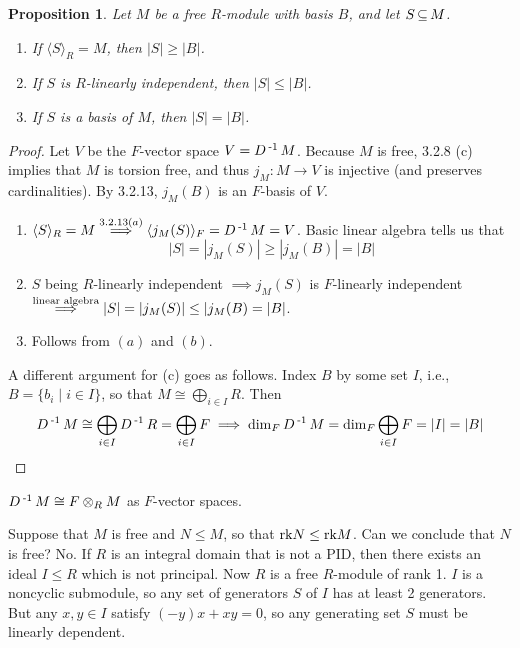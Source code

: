\documentclass[11pt]{book}
\newcounter{counter}
\newtheorem{proposition}[counter]{Proposition}   \newtheorem{problem}[counter]{Problem}   \newtheorem*{proposition*}{Proposition}   \newtheorem*{lemma*}{Lemma}
\theoremstyle{definition}   \newtheorem{defn}[counter]{Definition} %
\newcommand{\gen}[1]{\langle #1 \rangle}   \newcommand{\stab}[2]{\tn{Stab}_{#1}(#2)}   \newcommand{\fix}[2]{\tn{Fix}_{#1}(#2)}   \newcommand{\op}{^{\tn{op}}}
\DeclareMathOperator{\ra}{\rightarrow}   \DeclareMathOperator{\Poly}{\mathbf{P}}   \DeclareMathOperator{\spn}{\textnormal{span}}   \DeclareMathOperator{\aut}{\textnormal{Aut}}
\newcommand{\vs}{\vspace{8pt}}
\numberwithin{counter}{chapter}
\begin{document}
\vs

\begin{proposition}
Let $M$ be a free $R$-module with basis $B$, and let $S \operatorname{\subseteq} M$.
\begin{enumerate}
\item[(a)] If $\gen{S}_R = M$, then $|S| \geq |B|$.
\item[(b)] If $S$ is $R$-linearly independent, then $|S| \leq |B|$.
\item[(c)] If $S$ is a basis of $M$, then $|S| = |B|$.
\end{enumerate}
\end{proposition}

\begin{proof}
Let $V$ be the $F$-vector space $V = D\operatorname{^{-1}} M$. Because $M$ is free, 3.2.8 (c) implies that $M$ is torsion free, and thus $j_M : M \ra V$ is injective (and preserves cardinalities). By 3.2.13, $j_M(B)$ is an $F$-basis of $V$.
\begin{enumerate}
\item[(a)] $\gen{S}_R = M \overset{3.2.13 (a)}{\implies} \gen{j_M(S)}_F = D\inv M = V$. Basic linear algebra tells us that
	\[|S| = |j_M(S)| \geq |j_M(B)| = |B| \]
\item[(b)] $S$ being $R$-linearly independent $\implies j_M(S)$ is $F$-linearly independent $\overset{\textnormal{linear algebra}}{\implies} |S| = |j_M(S)| \leq |j_M(B) = |B|$.
\item[(c)] Follows from $(a)$ and $(b)$.
\end{enumerate}

A different argument for (c) goes as follows. Index $B$ by some set $I$, i.e., $B = \{b_i \mid i \in I\}$, so that $M \cong \bigoplus_{i \in I} R$. Then
	\[D\operatorname{^{-1}} M \cong \bigoplus_{i \in I} D\operatorname{^{-1}} R = \bigoplus_{i \in I} F \implies \dim_F D\operatorname{^{-1}} M = \dim_F \bigoplus_{i \in I} F = |I| = |B| \]
\end{proof}

\vs

\begin{remark*}
$D\operatorname{^{-1}} M \cong F \otimes_R M$ as $F$-vector spaces.
\end{remark*}

\vs

Suppose that $M$ is free and $N \leq M$, so that $\textnormal{rk} N \leq \textnormal{rk} M$. Can we conclude that $N$ is free? No. If $R$ is an integral domain that is not a PID, then there exists an ideal $I \leq R$ which is not principal. Now $R$ is a free $R$-module of rank 1. $I$ is a noncyclic submodule, so any set of generators $S$ of $I$ has at least 2 generators. But any $x,y \in I$ satisfy $(-y) x + x y = 0$, so any generating set $S$ must be linearly dependent.
\end{document}
